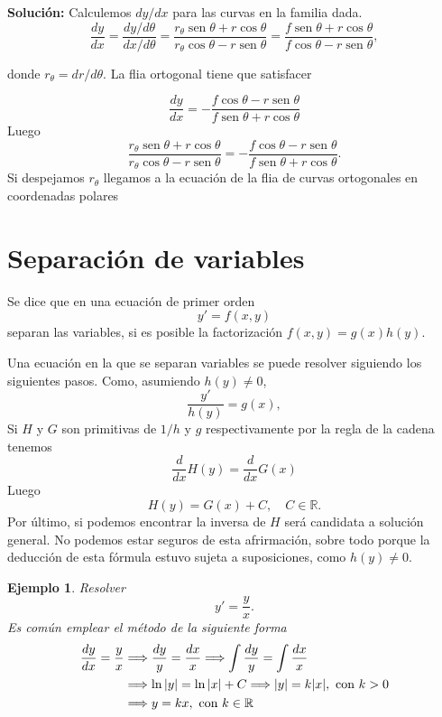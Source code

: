 \documentclass{article}
\newcommand{\rr}{\mathbb{R}}
\DeclareMathOperator{\sen}{sen}
\newtheorem{ejemplo}{Ejemplo}}
\begin{document}
\noindent\textbf{Solución:} Calculemos $dy/dx$ para las curvas en la familia dada.
\[\frac{dy}{dx}=\frac{dy/d\theta}{dx/d\theta}=\frac{r_{\theta}\sen\theta+r\cos\theta}{r_{\theta}\cos\theta-r\sen\theta}=\frac{f\sen\theta+r\cos\theta}{f\cos\theta-r\sen\theta},\]

donde $r_{\theta}=dr/d\theta$. La flia ortogonal tiene que satisfacer

\[\frac{dy}{dx}=-\frac{f\cos\theta-r\sen\theta}{f\sen\theta+r\cos\theta}\]
Luego
\[\frac{r_{\theta}\sen\theta+r\cos\theta}{r_{\theta}\cos\theta-r\sen\theta}=-\frac{f\cos\theta-r\sen\theta}{f\sen\theta+r\cos\theta}.\]
Si despejamos $r_{\theta}$ llegamos a la ecuación de la flia de curvas ortogonales en coordenadas polares





\section{Separación de variables}

\begin{definicion} Se dice que en una ecuación de primer orden
 \[y'=f(x,y)\]
 separan las variables, si es posible la factorización $f(x,y)=g(x)h(y)$.
\end{definicion}



Una ecuación  en la que se separan variables se puede resolver siguiendo los siguientes pasos. Como, asumiendo $h(y)\neq 0$,
\[\frac{y'}{h(y)}=g(x),\]
Si $H$ y $G$ son primitivas de $1/h$ y $g$ respectivamente por la regla de la cadena tenemos
\[\frac{d}{dx}H(y)=\frac{d}{dx}G(x)\]
Luego 
\[H(y)=G(x)+C,\quad C\in\rr.\]
Por último, si podemos encontrar la inversa de $H$
será candidata a solución general. No podemos estar seguros de esta afrirmación, sobre todo porque la deducción de esta fórmula estuvo sujeta a suposiciones, como $h(y)\neq 0$.



\begin{ejemplo} Resolver
\[y'=\frac{y}{x}.\]
Es común emplear el método de la siguiente forma
\[\begin{split}
   \frac{dy}{dx}=\frac{y}{x} &\Longrightarrow \frac{dy}{y}=\frac{dx}{x} \Longrightarrow \int \frac{dy}{y}=\int \frac{dx}{x}\\
   &\Longrightarrow\ln|y|=\ln|x|+C \Longrightarrow |y|= k|x|, \hbox{ con }k>0\\
   &\Longrightarrow y= kx, \hbox{ con }k\in\rr
  \end{split}
\]
\end{ejemplo}
\end{document}
